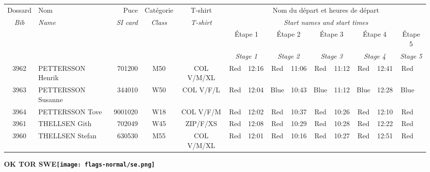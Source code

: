 \documentclass{report}
\begin{document}
  \begin{longtable}{|c|l|r|c|c|*{5}{cc|}}
    Dossard & Nom  & Puce    & Catégorie & T-shirt & \multicolumn{10}{c|}{Nom du départ et heures de départ} \\
    \itshape Bib     & \itshape Name & \itshape SI card & \itshape Class  & \itshape  T-shirt  & \multicolumn{10}{c|}{\itshape Start names and start times} \\
    \hline
    & & & & & \multicolumn{2}{c|}{Étape 1} & \multicolumn{2}{c|}{Étape 2} & \multicolumn{2}{c|}{Étape 3} & \multicolumn{2}{c|}{Étape 4} & \multicolumn{2}{c|}{Étape 5} \\
    & & & & & \multicolumn{2}{c|}{\itshape Stage 1} & \multicolumn{2}{c|}{\itshape Stage 2} & \multicolumn{2}{c|}{\itshape Stage 3} & \multicolumn{2}{c|}{\itshape Stage 4} & \multicolumn{2}{c|}{\itshape Stage 5} \\
    \hline
    3962 & PETTERSSON Henrik & 701200 & M50 & COL V/M/XL & Red & 12:16 & Red & 11:06 & Red & 11:12 & Red & 12:41 & Red &  \\
    3963 & PETTERSSON Susanne & 344010 & W50 & COL V/F/L & Red & 12:04 & Blue & 10:43 & Blue & 11:12 & Blue & 12:28 & Blue &  \\
    3964 & PETTERSSON Tove & 9001020 & W18 & COL V/F/M & Red & 12:02 & Red & 10:37 & Red & 10:26 & Red & 12:10 & Red &  \\
    3961 & THELLSEN Gith & 702049 & W45 & ZIP/F/XS & Red & 12:08 & Red & 10:29 & Red & 10:28 & Red & 12:22 & Red &  \\
    3960 & THELLSEN Stefan & 630530 & M55 & COL V/M/XL & Red & 12:01 & Red & 10:16 & Red & 10:27 & Red & 12:51 & Red &  \\
  \end{longtable}
\newpage
  \Huge \centering \bfseries OK TOR  SWE\normalfont \footnotesize \sffamily \hfill \texttt{[image: flags-normal/se.png]} \newline 
\end{document}
